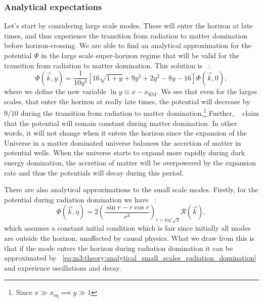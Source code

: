 \subsubsection{Analytical expectations}\label{sec:m3:theory:analytical_expectations}
    Let's start by considering large scale modes. These will enter the horizon at late times, and thus experience the transition from radiation to matter domination before horizon-crossing. We are able to find an analytical approximation for the potential $\Phi$ in the large scale super-horizon regime that will be valid for the transition from radiation to matter domination. This solution is ~\cite[Eq. 8.31]{dodelson2020modern}:
    \begin{equation}\label{eq:m3:theory:analytical_large_scale_super_horizon}
        \Phi(\vec{k},y) = \frac{1}{10y^3}\left[16\sqrt{1+y} + 9y^3 + 2y^2-8y-16\right]\Phi(\vec{k},0),
    \end{equation}
    where we define the new variable $\ln y \equiv x-x_\mathrm{RM}$. We see that even for the larges scales, that enter the horizon at really late times, the potential will decrease by $9/10$ during the transition from radiation to matter domination.\footnote{Since $x\gg x_\mathrm{eq} \implies y\gg 1$} Further, ~\cite{dodelson2020modern} claim that the potential will remain constant during matter domination. In other words, it will not change when it enters the horizon since the expansion of the Universe in a matter dominated universe balances the accretion of matter in potential wells. When the universe starts to expand more rapidly during dark energy domination, the accretion of matter will be overpowered by the expansion rate and thus the potentials will decay during this period. 

    There are also analytical approximations to the small scale modes. Firstly, for the potential during radiation domination we have ~\cite[Eq. 8.46]{dodelson2020modern}:
    \begin{equation}\label{eq:m3:theory:analytical_small_scales_radiation_domination}
        \Phi(\vec{k},\eta) = 2\left(\frac{\sin{r} - r\cos{r}}{r^3}\right)_{r=k\eta/\sqrt{3}}\mathcal{R}(\vec{k}),
    \end{equation}
    which assumes a constant initial condition which is fair since initially all modes are outside the horizon, unaffected by causal physics. What we draw from this is that if the mode enters the horizon during radiation domination it can be approximated by ~\cref{eq:m3:theory:analytical_small_scales_radiation_domination} and experience oscillations and decay. 

